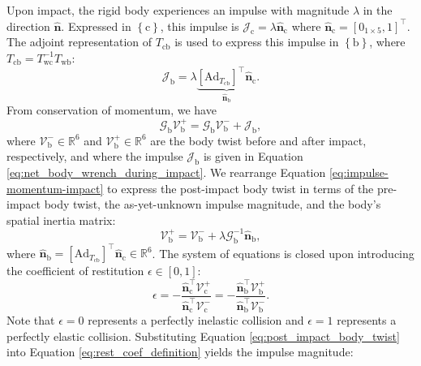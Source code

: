 \documentclass[]{article}
\newcommand{\transpose}{^{\top}}
\newcommand{\colvec}[1]{\mathbf{#1}}
\newcommand{\cframe}[1]{\left\{\mathrm{#1}\right\}}
\newcommand{\Ad}[1]{\left[\mathrm{Ad}_{T_\mathrm{#1}}\right]}
\theoremstyle{definition}
\theoremstyle{remark}
\begin{document}
Upon impact, the rigid body experiences an impulse with magnitude $\lambda$ in the direction $\hat{\colvec{n}}$.
Expressed in $\cframe{c}$, this impulse is $\mathcal{J}_\mathrm{c} = \lambda\hat{\colvec{n}}_\mathrm{c}$ where $\hat{\colvec{n}}_\mathrm{c} = \left[0_{1\times 5},1\right]\transpose$.
The adjoint representation of $T_\mathrm{cb}$ is used to express this impulse in $\cframe{b}$, where $T_\mathrm{cb} = T_\mathrm{wc}^{-1}T_\mathrm{wb}$:
\begin{equation}\label{eq:net_body_wrench_during_impact}
	\mathcal{J}_\mathrm{b}
	=
	\lambda
	\underbrace{\Ad{cb}\transpose\hat{\colvec{n}}_\mathrm{c}}_{\hat{\colvec{n}}_\mathrm{b}}.
\end{equation}
From conservation of momentum, we have
\begin{equation}\label{eq:impulse-momentum-impact}
	\mathcal{G}_\mathrm{b}\mathcal{V}_\mathrm{b}^+ = \mathcal{G}_\mathrm{b}\mathcal{V}_\mathrm{b}^- + \mathcal{J}_\mathrm{b},
\end{equation}
where $\mathcal{V}_\mathrm{b}^-\in\mathbb{R}^6$ and $\mathcal{V}_\mathrm{b}^+\in\mathbb{R}^6$ are the body twist before and after impact, respectively, and where the impulse $\mathcal{J}_\mathrm{b}$ is given in Equation \eqref{eq:net_body_wrench_during_impact}.
We rearrange Equation \eqref{eq:impulse-momentum-impact} to express the post-impact body twist in terms of the pre-impact body twist, the as-yet-unknown impulse magnitude, and the body's spatial inertia matrix:
\begin{equation}\label{eq:post_impact_body_twist}
	\mathcal{V}_\mathrm{b}^+ = \mathcal{V}_\mathrm{b}^- + \lambda \mathcal{G}_\mathrm{b}^{-1}\hat{\colvec{n}}_\mathrm{b},
\end{equation}
where $\hat{\colvec{n}}_\mathrm{b} = \Ad{cb}\transpose\hat{\colvec{n}}_\mathrm{c}\in\mathbb{R}^6$.
The system of equations is closed upon introducing the coefficient of restitution $\epsilon\in\left[0,1\right]$:
\begin{equation}\label{eq:rest_coef_definition}
	\epsilon = -\frac{\hat{\colvec{n}}_\mathrm{c}\transpose\mathcal{V}_\mathrm{c}^+}{\hat{\colvec{n}}_\mathrm{c}\transpose\mathcal{V}_\mathrm{c}^-} = -\frac{\hat{\colvec{n}}_\mathrm{b}\transpose\mathcal{V}_\mathrm{b}^+}{\hat{\colvec{n}}_\mathrm{b}\transpose\mathcal{V}_\mathrm{b}^-}.
\end{equation}
Note that $\epsilon = 0$ represents a perfectly inelastic collision and $\epsilon = 1$ represents a perfectly elastic collision.
Substituting Equation \eqref{eq:post_impact_body_twist} into Equation \eqref{eq:rest_coef_definition} yields the impulse magnitude:
\end{document}
